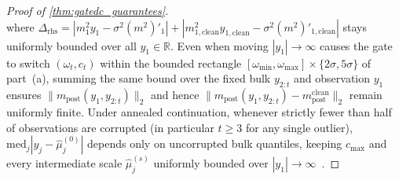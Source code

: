 \documentclass[11pt,a4paper,reqno]{amsart}
\theoremstyle{definition}
\theoremstyle{remark}
\newcommand{\R}{\mathbb{R}}
\begin{document}
\begin{proof}[Proof of \cref{thm:gatedc_guarantees}]
\[\]
where $\Delta_{\mathrm{rhs}} = |m_1^2 y_1 - \sigma^2(m^2)'_1| + |m_{1,\mathrm{clean}}^2 y_{1,\mathrm{clean}} - \sigma^2(m^2)'_{1,\mathrm{clean}}|$ stays uniformly bounded over all $y_1 \in \R$. Even when moving $|y_1| \to \infty$ causes the gate to switch $(\omega_t, c_t)$ within the bounded rectangle $[\omega_{\min}, \omega_{\max}] \times \{2\sigma, 5\sigma\}$ of part~(a), summing the same bound over the fixed bulk $y_{2:t}$ and observation $y_1$ ensures $\|m_{\mathrm{post}}(y_1, y_{2:t})\|_2$ and hence $\|m_{\mathrm{post}}(y_1, y_{2:t}) - m_{\mathrm{post}}^{\mathrm{clean}}\|_2$ remain uniformly finite. Under annealed continuation, whenever strictly fewer than half of observations are corrupted (in particular $t \ge 3$ for any single outlier), $\mathrm{med}_j |y_j - \hat{\mu}_j^{(0)}|$ depends only on uncorrupted bulk quantiles, keeping $c_{\max}$ and every intermediate scale $\hat{\mu}_j^{(s)}$ uniformly bounded over $|y_1| \to \infty$~\cite{huber1964robust}.


\end{proof}
\end{document}
